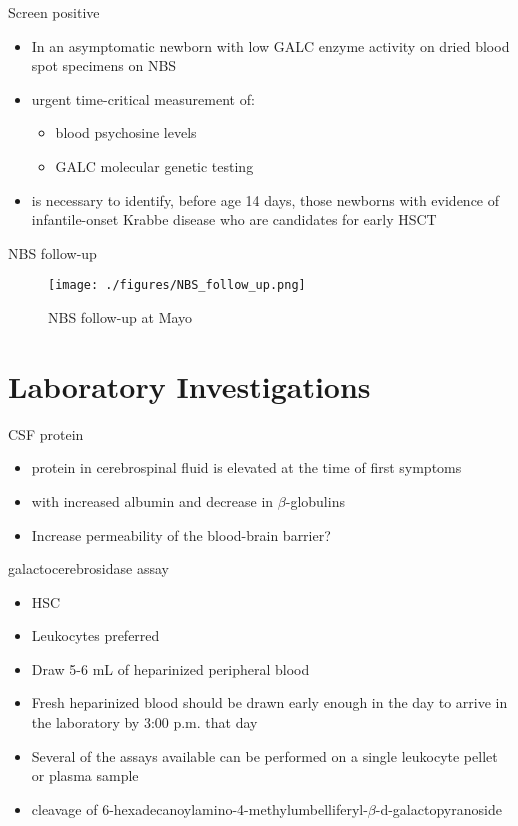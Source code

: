 \documentclass[presentation, smaller]{beamer}
\begin{document}
\begin{frame}[label={sec:org67162ff}]{Screen positive}
\begin{itemize}
\item In an asymptomatic newborn with low GALC enzyme activity
on dried blood spot specimens on NBS
\item urgent time-critical measurement of:
\begin{itemize}
\item blood psychosine levels
\item GALC molecular genetic testing
\end{itemize}
\item is necessary to identify, before age 14 days, those newborns with
evidence of infantile-onset Krabbe disease who are candidates for
early HSCT
\end{itemize}
\end{frame}

\begin{frame}[label={sec:orge2d093c}]{NBS follow-up}
\begin{figure}[htbp]
\centering
\texttt{[image: ./figures/NBS\_follow\_up.png]}
\caption{\label{fig:org4d9e71a}
NBS follow-up at Mayo}
\end{figure}
\end{frame}


\section{Laboratory Investigations}
\label{sec:orgbcd3a4b}

\begin{frame}[label={sec:org0c48f72}]{CSF protein}
\begin{itemize}
\item protein in cerebrospinal fluid is elevated at the time of first symptoms
\item with increased albumin and decrease in \(\beta\)-globulins
\item Increase permeability of the blood-brain barrier?
\end{itemize}
\end{frame}

\begin{frame}[label={sec:org745acfd}]{galactocerebrosidase assay}
\begin{itemize}
\item HSC
\item Leukocytes preferred
\item Draw 5-6 mL of heparinized peripheral blood
\item Fresh heparinized blood should be drawn early enough in the day to arrive in the laboratory by 3:00 p.m. that day
\item Several of the assays available can be performed on a single leukocyte pellet or plasma sample

\item cleavage of 6-hexadecanoylamino-4-methylumbelliferyl-\(\beta\)-d-galactopyranoside
\end{itemize}
\end{frame}
\end{document}
